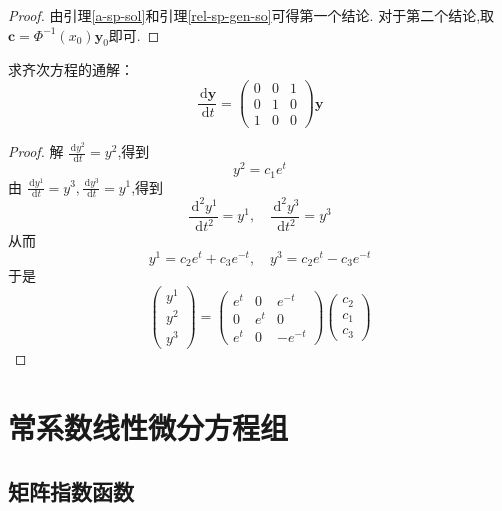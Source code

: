\documentclass[lang=cn,12pt,color=green,fontset=none]{elegantbook}
\begin{document}
\begin{proof}
    由引理\ref{a-sp-sol}和引理\ref{rel-sp-gen-so}可得第一个结论.
    对于第二个结论,取 $ \mathbf{c}= \Phi ^{-1} \left( x_0 \right)\mathbf{y}_{0}  $即可. 
\end{proof}

\begin{example}
    求齐次方程的通解： $$
    \frac{\,\mathrm{d} \mathbf{y} }{ \,\mathrm{d} t}= \begin{pmatrix} 
        0& 0& 1\\ 
         
        0& 1& 0\\ 
         
        1& 0& 0

    \end{pmatrix}  \mathbf{y}
    $$
\end{example}

\begin{proof}
    解 $ \frac{\,\mathrm{d} y^{2} }{\,\mathrm{d} t }  =y^{2}$,得到 $$
    y^{2}= c_1e^{t}
    $$ 由 $ \frac{\,\mathrm{d} y^{1} }{\,\mathrm{d} t }=y^{3}, \frac{\,\mathrm{d} y^{3} }{\,\mathrm{d} t }  =y^{1} $,得到 $$
    \frac{\,\mathrm{d} ^{2}y^{1} }{\,\mathrm{d} t^{2} }=y^{1},\quad  \frac{\,\mathrm{d} ^{2}y^{3} }{\,\mathrm{d} t^{2} }  =y^{3}
    $$ 从而 $$
    y^{1}=c_2e^{t}+ c_3e^{-t},\quad  y^{3}=c_2e^{t}-c_3e^{-t}
    $$于是 $$
    \begin{pmatrix} 
        y^{1}\\ 
         y^{2}\\ 
          y^{3} 
    \end{pmatrix} = \begin{pmatrix} 
         e^{t}& 0& e^{-t}\\ 
          0& e^{t}& 0\\ 
           e^{t}& 0& -e^{-t} 
    \end{pmatrix} \begin{pmatrix} 
        c_2\\ 
         c_1\\ 
          c_3 
    \end{pmatrix}   
    $$
\end{proof}

\section{常系数线性微分方程组}

\subsection{矩阵指数函数}   
\end{document}

